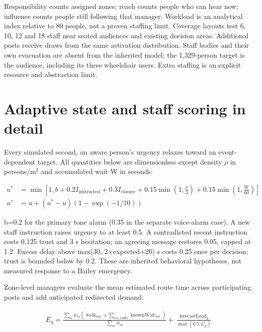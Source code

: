 \documentclass[11pt,a4paper]{article}
\begin{document}
Responsibility counts assigned zones; reach counts people who can hear now; influence counts people still following that manager. Workload is an analytical index relative to 80 people, not a proven staffing limit. Coverage layouts test 6, 10, 12 and 18 staff near seated audiences and existing decision areas. Additional posts receive draws from the same activation distribution. Staff bodies and their own evacuation are absent from the inherited model; the 1,329-person target is the audience, including its three wheelchair users. Extra staffing is an explicit resource and abstraction limit.


\section{Adaptive state and staff scoring in detail}\label{sec:10a}

Every simulated second, an aware person's urgency relaxes toward an event-dependent target. All quantities below are dimensionless except density \ensuremath{\rho} in persons/m\ensuremath{{}^2} and accumulated wait W in seconds:


\begin{equation}
\begin{aligned}
u^*&=\min\!\left[1,b+0.2I_{\mathrm{instructed}}+0.3I_{\mathrm{closure}}+0.15\min\!\left(1,\frac\rho3\right)+0.15\min\!\left(1,\frac W{60}\right)\right] \\
u'&=u+(u^*-u)(1-\exp(-1/10))
\end{aligned}
\tag{16a}\label{eq:16a}
\end{equation}

b=0.2 for the primary tone alarm (0.35 in the separate voice-alarm case). A new staff instruction raises urgency to at least 0.5. A contradicted recent instruction costs 0.125 trust and 3 s hesitation; an agreeing message restores 0.05, capped at 1.2. Excess delay above max(30, 2\ensuremath{\times}expected+20) s costs 0.25 once per decision; trust is bounded below by 0.2. These are inherited behavioral hypotheses, not measured response to a Bailey emergency.


Zone-level managers evaluate the mean estimated route time across participating posts and add anticipated redirected demand:


\begin{equation}
\begin{aligned}
E_g=\frac{\sum_m w_m\left(\operatorname{walk}_{mg}+\sum_{k\in\text{route}}\operatorname{knownWait}_{mk}\right)}{\sum_m w_m}
+\frac{\operatorname{forecastLoad}_g}{\max(0.5,C_g)}
\end{aligned}
\tag{16b}\label{eq:16b}
\end{equation}
\end{document}
